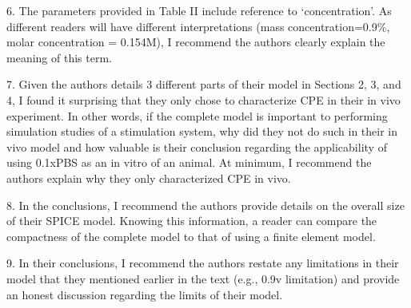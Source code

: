 \documentclass[journal, a4paper]{IEEEtran}
\begin{document}
{    6. The parameters provided in Table II include reference to `concentration'. As different readers will have different interpretations (mass concentration=0.9\%, molar concentration = 0.154M), I recommend the authors clearly explain the meaning of this term.

    7. Given the authors details 3 different parts of their model in Sections 2, 3, and 4, I found it surprising that they only chose to characterize CPE in their in vivo experiment. In other words, if the complete model is important to performing simulation studies of a stimulation system, why did they not do such in their in vivo model and how valuable is their conclusion regarding the applicability of using 0.1xPBS as an in vitro of an animal. At minimum, I recommend the authors explain why they only characterized CPE in vivo.

    8. In the conclusions, I recommend the authors provide details on the overall size of their SPICE model. Knowing this information, a reader can compare the compactness of the complete model to that of using a finite element model.

    9. In their conclusions, I recommend the authors restate any limitations in their model that they mentioned earlier in the text (e.g., 0.9v limitation) and provide an honest discussion regarding the limits of their model.
}
\end{document}
